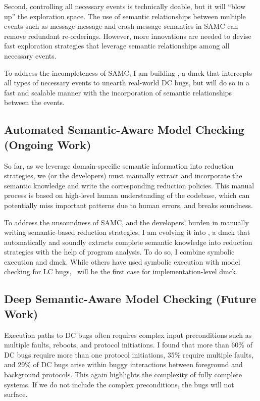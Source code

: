 \documentclass[11pt]{article}
\begin{document}
Second, controlling all necessary events is technically doable, but it will
``blow up'' the exploration space. The use of semantic relationships between
multiple events such as message-message and crash-message semantics in SAMC can
remove redundant re-orderings. However, more innovations are needed to devise
fast exploration strategies that leverage semantic relationships among all
necessary events.

To address the incompleteness of SAMC, I am building \fullcheck, a dmck that
intercepts all types of necessary events to unearth real-world DC bugs, but
will do so in a fast and scalable manner with the incorporation of semantic
relationships between the events.


\subsection{Automated Semantic-Aware Model Checking (Ongoing Work)} 

So far, as we leverage domain-specific semantic information into reduction
strategies, we (or the developers) must manually extract and incorporate the
semantic knowledge and write the corresponding reduction policies. This manual
process is based on high-level human understanding of the codebase, which can
potentially miss important patterns due to human errors, and breaks soundness.

To address the unsoundness of SAMC, and the developers' burden in manually
writing semantic-based reduction strategies, I am evolving it into \autocheck,
a dmck that automatically and soundly extracts complete semantic knowledge into
reduction strategies with the help of program analysis.
%
To do so, I combine symbolic execution and dmck. While others have used symbolic
execution with model checking for LC bugs, \autocheck\ will be the first case for
implementation-level dmck. 

\subsection{Deep Semantic-Aware Model Checking (Future Work)}

Execution paths to DC bugs often requires complex input preconditions such as
multiple faults, reboots, and protocol initiations. I found that more than 60\%
of DC bugs require more than one protocol initiations, 35\% require multiple
faults, and 29\% of DC bugs arise within buggy interactions between foreground
and background protocols.  This again highlights the complexity of fully
complete systems. If we do not include the complex preconditions, the bugs will
not surface.
\end{document}
